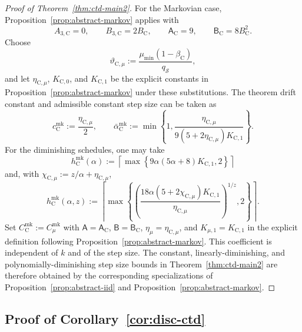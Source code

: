 \documentclass{article}
\newcommand{\X}{\mathcal{S}}
\begin{document}
\begin{proof}[Proof of Theorem~\ref{thm:ctd-main2}]
For the Markovian case, Proposition~\ref{prop:abstract-markov} applies with
\begin{equation}
A_{3,\mathrm C}=0,\qquad B_{3,\mathrm C}=2B_{\mathrm C},\qquad
\mathsf A_{\mathrm C}=9,\qquad \mathsf B_{\mathrm C}=8B_{\mathrm C}^2.
\end{equation}
Choose
\begin{equation}
\vartheta_{\mathrm C,\mu}:=\frac{\mu_{\min}(1-\beta_{\mathrm C})}{q_{\X}},
\end{equation}
and let $\eta_{\mathrm C,\mu}$, $K_{\mathrm C,0}$, and $K_{\mathrm C,1}$ be the explicit constants in Proposition~\ref{prop:abstract-markov} under these substitutions. The theorem drift constant and admissible constant step size can be taken as
\begin{equation}
c_{\mathrm C}^{\mathrm{mk}}:=\frac{\eta_{\mathrm C,\mu}}{2},\qquad
\bar\alpha_{\mathrm C}^{\mathrm{mk}}:=\min\left\{1,\frac{\eta_{\mathrm C,\mu}}{9(5+2\eta_{\mathrm C,\mu})K_{\mathrm C,1}}\right\}.
\end{equation}
For the diminishing schedules, one may take
\begin{equation}
h_{\mathrm C}^{\mathrm{mk}}(\alpha):=\left\lceil\max\left\{9\alpha(5\alpha+8)K_{\mathrm C,1},2\right\}\right\rceil
\end{equation}
and, with $\chi_{\mathrm C,\mu}:=z/\alpha+\eta_{\mathrm C,\mu}$,
\begin{equation}
h_{\mathrm C}^{\mathrm{mk}}(\alpha,z):=\left\lceil\max\left\{\left(\frac{18\alpha(5+2\chi_{\mathrm C,\mu})K_{\mathrm C,1}}{\eta_{\mathrm C,\mu}}\right)^{1/z},2\right\}\right\rceil.
\end{equation}
Set $C_{\mathrm C}^{\mathrm{mk}}:=C_\mu^{\mathrm{mk}}$ with $\mathsf A=\mathsf A_{\mathrm C}$, $\mathsf B=\mathsf B_{\mathrm C}$, $\eta_\mu=\eta_{\mathrm C,\mu}$, and $K_{\mu,1}=K_{\mathrm C,1}$ in the explicit definition following Proposition~\ref{prop:abstract-markov}. This coefficient is independent of $k$ and of the step size.
The constant, linearly-diminishing, and polynomially-diminishing step size bounds in Theorem~\ref{thm:ctd-main2} are therefore obtained by the corresponding specializations of Proposition~\ref{prop:abstract-iid} and Proposition~\ref{prop:abstract-markov}.
\end{proof}
\subsection{Proof of Corollary~\ref{cor:disc-ctd}}
\end{document}
